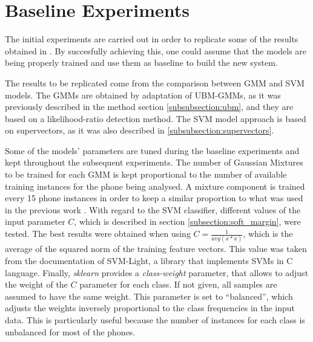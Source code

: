 
\section{Baseline Experiments}

The initial experiments are carried out in order to replicate some of
the results obtained in \cite{main}.
By succesfully achieving this, one could assume that the models are being properly trained
and use them as baseline to build the new system.

The results to be replicated come from the comparison between GMM and SVM models.
The GMMs are obtained by adaptation of UBM-GMMs, as it was previously described in
the method section \ref{subsubsection:ubm}, and they are based on
a likelihood-ratio detection method.
The SVM model approach is based on supervectors, as it was also described
in \ref{subsubsection:supervectors}.

Some of the models' parameters are tuned during the baseline experiments
and kept throughout the subsequent experiments.
The number of Gaussian Mixtures to be trained for each GMM
is kept proportional to the number of
available training instances for the phone being analysed. A
mixture component is trained every 15 phone instances
in order to keep a similar proportion to what was used in the previous work \cite{main}.
With regard to the SVM classifier,
different values of the input parameter $C$, which is described in section
\ref{subsection:soft_margin}, were tested. The best results were obtained when
using $C=\frac{1}{avg(x*x)}$, which is the average of the squared norm of the
training feature vectors. This value was taken from
the documentation of SVM-Light, a library
that implements SVMs in C language. Finally, \textit{sklearn} provides a
\textit{class-weight} parameter, that allows to
adjust the weight of the $C$ parameter for each class.
If not given, all samples are assumed to have the same weight.
This parameter is set to ``balanced'', which adjusts
the weights inversely proportional to the class frequencies in the input data.
This is particularly useful because the number of instances
for each class is
unbalanced for most of the phones.

